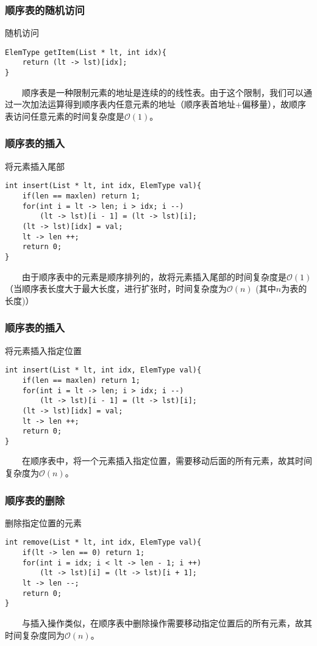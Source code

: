 \documentclass{beamer}
\begin{document}
	\begin{frame}[fragile]\frametitle{顺序表的随机访问}
		\begin{block}{随机访问}
\begin{verbatim}
ElemType getItem(List * lt, int idx){
    return (lt -> lst)[idx];
}
\end{verbatim}
		\end{block}
		\ \ \ \ 顺序表是一种限制元素的地址是连续的的线性表。由于这个限制，我们可以通过一次加法运算得到顺序表内任意元素的地址（顺序表首地址+偏移量），故顺序表访问任意元素的时间复杂度是$\mathcal{O}(1)$。
	\end{frame}

	\begin{frame}[fragile]\frametitle{顺序表的插入}
		\begin{block}{将元素插入尾部}
\begin{verbatim}
int insert(List * lt, int idx, ElemType val){
    if(len == maxlen) return 1;
    for(int i = lt -> len; i > idx; i --)
        (lt -> lst)[i - 1] = (lt -> lst)[i];
    (lt -> lst)[idx] = val;
    lt -> len ++;
    return 0;
}
\end{verbatim}
		\end{block}
		\ \ \ \ 由于顺序表中的元素是顺序排列的，故将元素插入尾部的时间复杂度是$\mathcal{O}(1)$（当顺序表长度大于最大长度，进行扩张时，时间复杂度为$\mathcal{O}(n)$ (其中$n$为表的长度)）
	\end{frame}

	\begin{frame}[fragile]\frametitle{顺序表的插入}
		\begin{block}{将元素插入指定位置}
\begin{verbatim}
int insert(List * lt, int idx, ElemType val){
    if(len == maxlen) return 1;
    for(int i = lt -> len; i > idx; i --)
        (lt -> lst)[i - 1] = (lt -> lst)[i];
    (lt -> lst)[idx] = val;
    lt -> len ++;
    return 0;
}
\end{verbatim}
		\end{block}
		\ \ \ \ 在顺序表中，将一个元素插入指定位置，需要移动后面的所有元素，故其时间复杂度为$\mathcal{O}(n)$。
	\end{frame}

	\begin{frame}[fragile]\frametitle{顺序表的删除}
		\begin{block}{删除指定位置的元素}
\begin{verbatim}
int remove(List * lt, int idx, ElemType val){
    if(lt -> len == 0) return 1;
    for(int i = idx; i < lt -> len - 1; i ++)
        (lt -> lst)[i] = (lt -> lst)[i + 1];
    lt -> len --;
    return 0;
}
\end{verbatim}
		\end{block}
	\ \ \ \ 与插入操作类似，在顺序表中删除操作需要移动指定位置后的所有元素，故其时间复杂度同为$\mathcal{O}(n)$。
	\end{frame}
\end{document}
